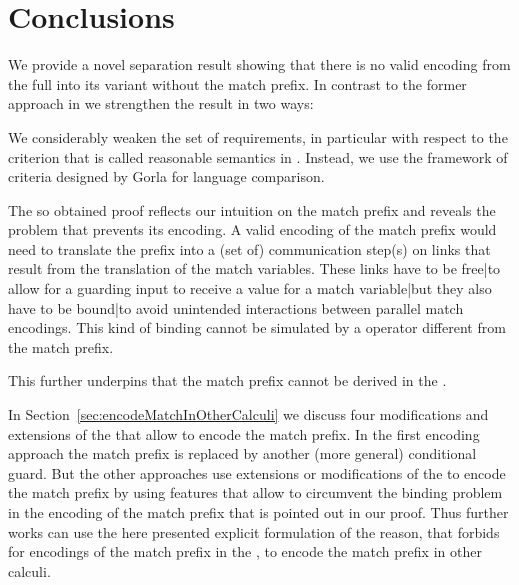 \documentclass[]{article}
\begin{document}
\section{Conclusions}
\label{sec:conclusions}

We provide a novel separation result showing that there is no valid encoding from the full \piCal into its variant without the match prefix. In contrast to the former approach in \cite{carbone} we strengthen the result in two ways:
\begin{compactenum}
	\item We considerably weaken the set of requirements, in particular with respect to the criterion that is called reasonable semantics in \cite{carbone}. Instead, we use the framework of criteria designed by Gorla for language comparison.
	\item The so obtained proof reflects our intuition on the match prefix and reveals the problem that prevents its encoding. A valid encoding of the match prefix would need to translate the prefix into a (set of) communication step(s) on links that result from the translation of the match variables. These links have to be free|to allow for a guarding input to receive a value for a match variable|but they also have to be bound|to avoid unintended interactions between parallel match encodings. This kind of binding cannot be simulated by a \piCal operator different from the match prefix.
\end{compactenum}
This further underpins that the match prefix cannot be derived in the \piCal.

In Section~\ref{sec:encodeMatchInOtherCalculi} we discuss four modifications and extensions of the \piCal that allow to encode the match prefix. 
In the first encoding approach the match prefix is replaced by another (more general) conditional guard. But the other approaches use extensions or modifications of the \piCal to encode the match prefix by using features that allow to circumvent the binding problem in the encoding of the match prefix that is pointed out in our proof.
Thus further works can use the here presented explicit formulation of the reason, that forbids for encodings of the match prefix in the \piCal, to encode the match prefix in other calculi.



\end{document}
